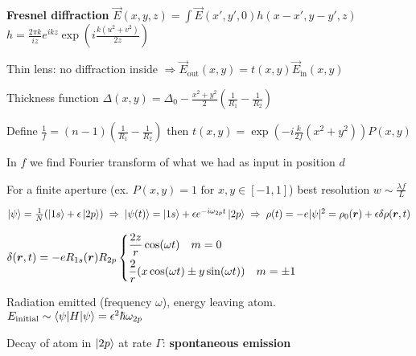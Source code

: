 \begin{squishlist}
    \item \textbf{Fresnel diffraction} $\vec{E}(x,y,z) = \int \vec{E}(x',y',0) h(x-x', y-y', z)$ \\
    $h = \frac{2\pi k}{iz} e^{ikz} \exp \left(i \frac{k(u^2 + v^2)}{2z}\right)$
\end{squishlist}
\begin{squishlist}
    \item Thin lens: no diffraction inside $ \Rightarrow \vec{E}_{\text{out}}(x,y) = t(x,y) \vec{E}_{\text{in}}(x,y)$
    \item Thickness function $\Delta(x,y) = \Delta_0 - \frac{x^2 + y^2}{2} \left( \frac{1}{R_1} - \frac{1}{R_2} \right)$
    \item Define $\frac{1}{f} = (n-1) \left( \frac{1}{R_1} - \frac{1}{R_2} \right)$ then $t(x,y) = \exp(-i \frac{k}{2f}(x^2 + y^2)) P(x,y)$
    \item In $f$ we find Fourier transform of what we had as input in position $d$
    \item For a finite aperture (ex. $P(x,y)=1 \text{ for } x,y \in [-1,1]$) best resolution $w \sim \frac{\lambda f}{L}$
\end{squishlist}

\begin{squishlist}
    \item $\ket{\psi} = \frac{1}{N}(\ket{1s} + \epsilon \ket{2p}) \; \Rightarrow \; \ket{\psi(t)} = \ket{1s} + \epsilon e^{-i\omega_{2p}t}\ket{2p} \; \Rightarrow \; \rho(t) = -e |\psi|^2 = \rho_0(\bm{r}) + \epsilon \delta \rho(\bm{r}, t)$
    \item $\delta(\bm{r},t) = -e R_{1s}(\bm{r}) R_{2p} \left\{
    \begin{aligned}
        &\frac{2z}{r}\cos(\omega t) \quad m=0 \\
        &\frac{2}{r} (x \cos(\omega t) \pm y\sin(\omega t)) \quad m=\pm 1
    \end{aligned}
    \right.$
    \item Radiation emitted (frequency $\omega$), energy leaving atom. $E_{\text{initial}} \sim \braket{\psi|H|\psi} = \epsilon^2 \hbar \omega_{2p}$
    \item Decay of atom in $\ket{2p}$ at rate $\Gamma$: \textbf{spontaneous emission}
\end{squishlist}

